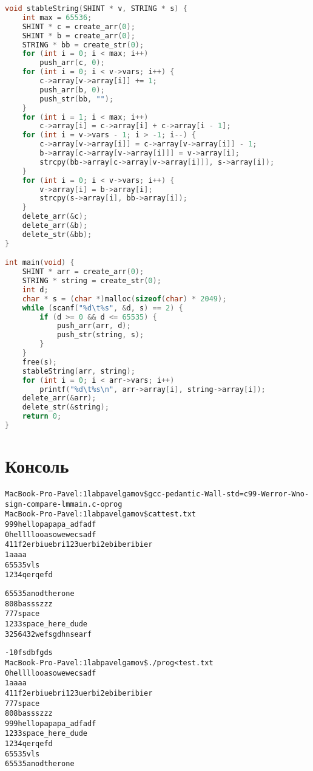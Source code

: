 \begin{lstlisting}[language=C]
void stableString(SHINT * v, STRING * s) {
    int max = 65536;
    SHINT * c = create_arr(0); 
    SHINT * b = create_arr(0); 
    STRING * bb = create_str(0); 
    for (int i = 0; i < max; i++)
        push_arr(c, 0); 
    for (int i = 0; i < v->vars; i++) {
        c->array[v->array[i]] += 1; 
        push_arr(b, 0); 
        push_str(bb, ""); 
    }
    for (int i = 1; i < max; i++)
        c->array[i] = c->array[i] + c->array[i - 1]; 
    for (int i = v->vars - 1; i > -1; i--) {
        c->array[v->array[i]] = c->array[v->array[i]] - 1;
        b->array[c->array[v->array[i]]] = v->array[i];
        strcpy(bb->array[c->array[v->array[i]]], s->array[i]); 
    }
    for (int i = 0; i < v->vars; i++) { 
        v->array[i] = b->array[i];
        strcpy(s->array[i], bb->array[i]);
    }
    delete_arr(&c);
    delete_arr(&b);
    delete_str(&bb);
}

int main(void) {
    SHINT * arr = create_arr(0); 
    STRING * string = create_str(0); 
    int d; 
    char * s = (char *)malloc(sizeof(char) * 2049); 
    while (scanf("%d\t%s", &d, s) == 2) { 
        if (d >= 0 && d <= 65535) { 
            push_arr(arr, d);
            push_str(string, s);
        }
    }
    free(s); 
    stableString(arr, string); 
    for (int i = 0; i < arr->vars; i++) 
        printf("%d\t%s\n", arr->array[i], string->array[i]);
    delete_arr(&arr); 
    delete_str(&string); 
    return 0;
}
\end{lstlisting}

\pagebreak

\section{Консоль}
\begin{alltt}
MacBook-Pro-Pavel:1lab pavelgamov\$ gcc -pedantic -Wall -std=c99 \newline -Werror -Wno-sign-compare -lm main.c -o prog
MacBook-Pro-Pavel:1lab pavelgamov\$ cat test.txt 
999 hellopapapa_adfadf
0   hellllooasowewecsadf
4	11f2erbiuebri123uerbi2ebiberibier
1	aaaa
65535	vls
1234	qerqefd

65535	anodtherone
808 bassszzz
777 space
1233    space_here_dude
3256432  wefsgdhnsearf

-10 fsdbfgds
MacBook-Pro-Pavel:1lab pavelgamov\$ ./prog < test.txt 
0	hellllooasowewecsadf
1	aaaa
4	11f2erbiuebri123uerbi2ebiberibier
777	space
808	bassszzz
999	hellopapapa_adfadf
1233	space_here_dude
1234	qerqefd
65535	vls
65535	anodtherone
\end{alltt}


